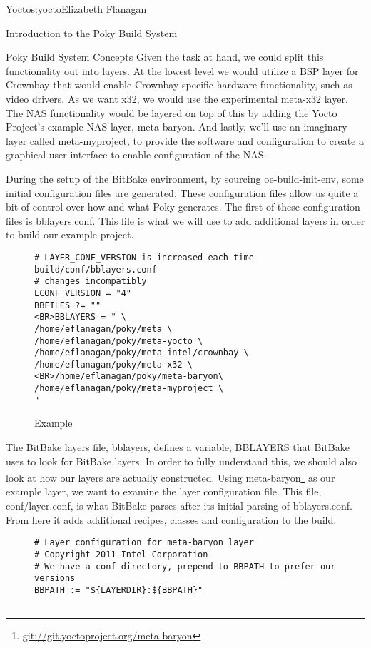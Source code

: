 \begin{aosachapter}{Yocto}{s:yocto}{Elizabeth Flanagan}
\begin{aosasect1}{Introduction to the Poky Build System}
\begin{aosasect2}{Poky Build System Concepts}
Given the task at hand, we could split this functionality out into
layers. At the lowest level we would utilize a BSP layer for Crownbay
that would enable Crownbay-specific hardware functionality, such as
video drivers. As we want x32, we would use the experimental meta-x32
layer. The NAS functionality would be layered on top of this by adding
the Yocto Project's example NAS layer, meta-baryon. And lastly, we'll
use an imaginary layer called meta-myproject, to provide the software
and configuration to create a graphical user interface to enable
configuration of the NAS.


During the setup of the BitBake environment, by sourcing
oe-build-init-env, some initial configuration files are generated.
These configuration files allow us quite a bit of control over how and
what Poky generates. The first of these configuration files is
bblayers.conf. This file is what we will use to add additional layers
in order to build our example project.

\begin{figure}
\begin{verbatim}
# LAYER_CONF_VERSION is increased each time build/conf/bblayers.conf
# changes incompatibly
LCONF_VERSION = "4"
BBFILES ?= ""
<BR>BBLAYERS = " \
/home/eflanagan/poky/meta \
/home/eflanagan/poky/meta-yocto \
/home/eflanagan/poky/meta-intel/crownbay \
/home/eflanagan/poky/meta-x32 \<BR>/home/eflanagan/poky/meta-baryon\
/home/eflanagan/poky/meta-myproject \
"
\end{verbatim}
\caption{Example }
\label{fig.yocto.bblayers}
\end{figure}

The BitBake layers file, bblayers, defines a variable, BBLAYERS that
BitBake uses to look for BitBake layers. In order to fully understand
this, we should also look at how our layers are actually
constructed. Using
meta-baryon\footnote{\url{git://git.yoctoproject.org/meta-baryon}} as
our example layer, we want to examine the layer configuration
file. This file, conf/layer.conf, is what BitBake parses after its
initial parsing of bblayers.conf. From here it adds additional
recipes, classes and configuration to the build.

\begin{figure}
\begin{verbatim}
# Layer configuration for meta-baryon layer
# Copyright 2011 Intel Corporation
# We have a conf directory, prepend to BBPATH to prefer our versions
BBPATH := "${LAYERDIR}:${BBPATH}"


\end{verbatim}
\end{figure}
\end{aosasect2}
\end{aosasect1}
\end{aosachapter}
